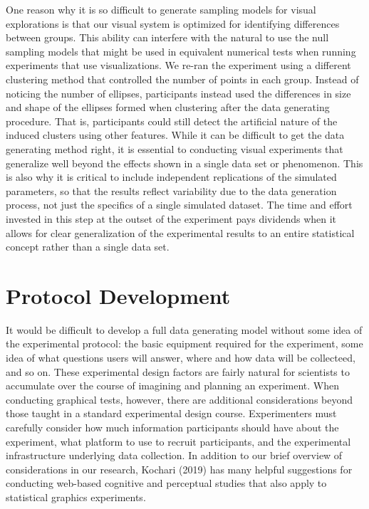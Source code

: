 \documentclass[
  10pt,
  letterpaper,
  DIV=11,
  numbers=noendperiod]{scrartcl}
\begin{document}
One reason why it is so difficult to generate sampling models for visual
explorations is that our visual system is optimized for identifying
differences between groups. This ability can interfere with the natural
to use the null sampling models that might be used in equivalent
numerical tests when running experiments that use visualizations. We
re-ran the experiment using a different clustering method that
controlled the number of points in each group. Instead of noticing the
number of ellipses, participants instead used the differences in size
and shape of the ellipses formed when clustering after the data
generating procedure. That is, participants could still detect the
artificial nature of the induced clusters using other features. While it
can be difficult to get the data generating method right, it is
essential to conducting visual experiments that generalize well beyond
the effects shown in a single data set or phenomenon. This is also why
it is critical to include independent replications of the simulated
parameters, so that the results reflect variability due to the data
generation process, not just the specifics of a single simulated
dataset. The time and effort invested in this step at the outset of the
experiment pays dividends when it allows for clear generalization of the
experimental results to an entire statistical concept rather than a
single data set.

\section{Protocol Development}\label{sec-exp-dev}

It would be difficult to develop a full data generating model without
some idea of the experimental protocol: the basic equipment required for
the experiment, some idea of what questions users will answer, where and
how data will be collecteed, and so on. These experimental design
factors are fairly natural for scientists to accumulate over the course
of imagining and planning an experiment. When conducting graphical
tests, however, there are additional considerations beyond those taught
in a standard experimental design course. Experimenters must carefully
consider how much information participants should have about the
experiment, what platform to use to recruit participants, and the
experimental infrastructure underlying data collection. In addition to
our brief overview of considerations in our research, Kochari (2019) has
many helpful suggestions for conducting web-based cognitive and
perceptual studies that also apply to statistical graphics experiments.
\end{document}
